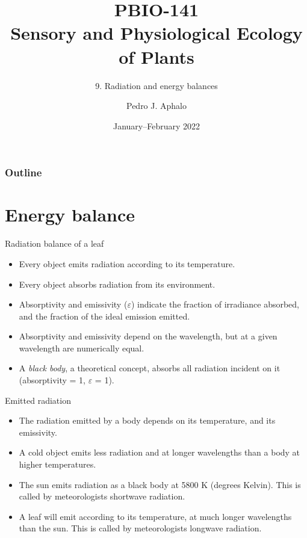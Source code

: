 \documentclass[10pt]{beamer}
\title{PBIO-141\\Sensory and Physiological Ecology\\ of  Plants}
\subtitle{9. Radiation and energy balances}
\author{Pedro J. Aphalo}
\date{January--February 2022}
\institute[Univ.\ of Helsinki]{M.Sc.\ in Plant Biology, University of Helsinki\\[2ex] \url{http://blogs.helsinki.fi/aphalo/}}
\begin{document}
  \begin{frame}
    \maketitle
  \end{frame}



  \begin{frame}
    \frametitle{Outline}
    \tableofcontents
  \end{frame}

\section{Energy balance}

\begin{frame}{Radiation balance of a leaf}
    \begin{itemize}
        \item Every object emits radiation according to its
        temperature.
        \item Every object absorbs radiation from its
        environment.
        \item Absorptivity and emissivity ($\varepsilon$) indicate the fraction of
        irradiance absorbed, and the fraction of the ideal emission
        emitted.
        \item Absorptivity and emissivity depend on the wavelength,
        but at a given wavelength are numerically equal.
        \item A \emph{black body}, a theoretical concept, absorbs
        all radiation incident on it (absorptivity = 1, $\varepsilon$ = 1).
    \end{itemize}
\end{frame}

\begin{frame}{Emitted radiation}
    \begin{itemize}
        \item The radiation emitted by a body depends on its
        temperature, and its emissivity.%
        \item A cold object emits less radiation and at longer
        wavelengths than a body at higher temperatures.%
        \item The sun emits radiation as a black body at 5800 K
        (degrees Kelvin). This is called by meteorologists shortwave radiation.%
        \item A leaf will emit according to its temperature, at
        much longer wavelengths than the sun. This is called by
        meteorologists longwave radiation.
    \end{itemize}
\end{frame}
\end{document}
